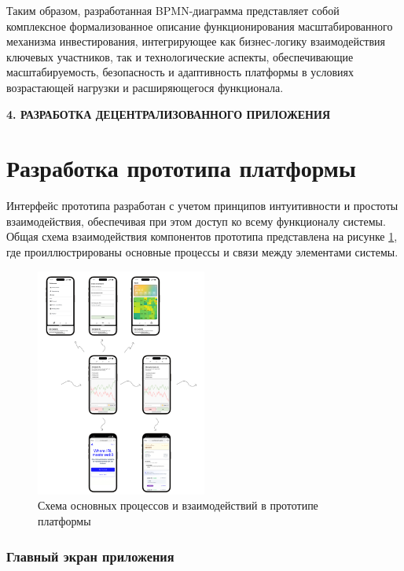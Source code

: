 \documentclass[
    candidate, %
    subf, %
    dotsinheaders=false,
]{disser}
\begin{document}
Таким образом, разработанная BPMN-диаграмма представляет собой комплексное формализованное описание функционирования масштабированного механизма инвестирования, интегрирующее как бизнес-логику взаимодействия ключевых участников, так и технологические аспекты, обеспечивающие масштабируемость, безопасность и адаптивность платформы в условиях возрастающей нагрузки и расширяющегося функционала.

\newpage
\begin{center}
  \textbf{4. РАЗРАБОТКА ДЕЦЕНТРАЛИЗОВАННОГО ПРИЛОЖЕНИЯ}
\end{center}


\section{Разработка прототипа платформы}

Интерфейс прототипа разработан с учетом принципов интуитивности и простоты взаимодействия, обеспечивая при этом доступ ко всему функционалу системы.
Общая схема взаимодействия компонентов прототипа представлена на рисунке \ref{fig:app-prototype}, где проиллюстрированы основные процессы и связи между элементами системы.

\begin{figure}[h]
  \centering
  \includegraphics[width=0.5\textwidth]{./assets/app-prototype.png}
  \caption{Схема основных процессов и взаимодействий в прототипе платформы}
  \label{fig:app-prototype}
\end{figure}

\subsubsection{Главный экран приложения}
\end{document}
